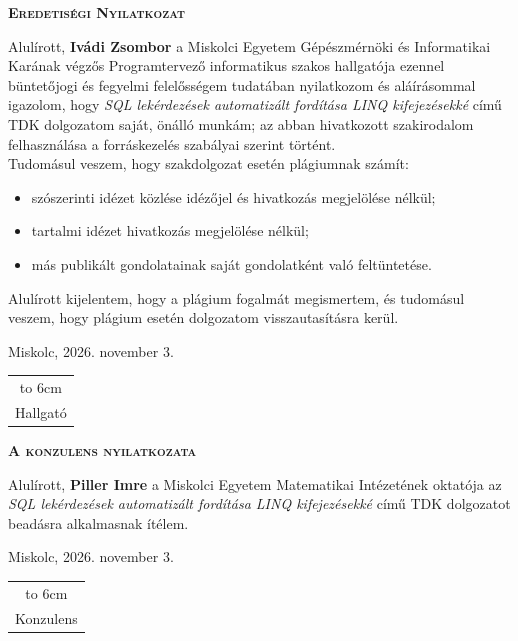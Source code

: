 \vspace*{1cm}  
\begin{center}
\large\textsc{\bfseries Eredetiségi Nyilatkozat}
\end{center}
\vspace*{2cm}  

Alulírott, \textbf{Ivádi Zsombor} a Miskolci Egyetem Gépészmérnöki és Informatikai Karának végzős Programtervező informatikus szakos hallgatója ezennel büntetőjogi és fegyelmi felelősségem tudatában nyilatkozom és aláírásommal igazolom, hogy \textit{SQL lekérdezések automatizált fordítása LINQ kifejezésekké}
című TDK dolgozatom saját, önálló munkám; az abban hivatkozott szakirodalom
felhasználása a forráskezelés szabályai szerint történt.\\

Tudomásul veszem, hogy szakdolgozat esetén plágiumnak számít:
\begin{itemize}
\item szószerinti idézet közlése idézőjel és hivatkozás megjelölése nélkül;
\item tartalmi idézet hivatkozás megjelölése nélkül;
\item más publikált gondolatainak saját gondolatként való feltüntetése.
\end{itemize}

Alulírott kijelentem, hogy a plágium fogalmát megismertem, és tudomásul veszem, hogy
plágium esetén dolgozatom visszautasításra kerül.

\vspace*{3cm}

\noindent Miskolc, 2026. november 3.

\vspace*{3cm}

\hspace*{8cm}\begin{tabular}{c}
\hbox to 6cm{\dotfill}\\
Hallgató
\end{tabular}

\newpage

\begin{center}
	\large\textsc{\bfseries A konzulens nyilatkozata}
\end{center}
\vspace*{2cm}  

Alulírott, \textbf{Piller Imre} a Miskolci Egyetem Matematikai Intézetének oktatója az
\textit{SQL lekérdezések automatizált fordítása LINQ kifejezésekké} című TDK dolgozatot beadásra alkalmasnak ítélem.

\vspace*{3cm}

\noindent Miskolc, 2026. november 3.

\vspace*{3cm}

\hspace*{8cm}\begin{tabular}{c}
	\hbox to 6cm{\dotfill}\\
	Konzulens
\end{tabular}
